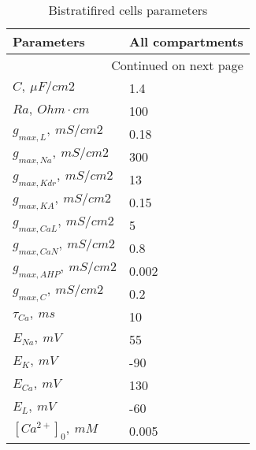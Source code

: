 \begin{longtable}{ll}
\caption{Bistratifired cells parameters}
\label{tabel:ca1_bis_cell_parameters}\\
\toprule
                                        Parameters & All compartments \\
\midrule
\endhead
\midrule
\multicolumn{2}{r}{{Continued on next page}} \\
\midrule
\endfoot

\bottomrule
\endlastfoot
$C,\ \mu F/cm2$ &    1.4 \\
$Ra,\ Ohm \cdot cm$ & 100 \\
$g_{max, L},\ mS/cm2 $ & 0.18 \\
$g_{max, Na}, \ mS/cm2$ &              300 \\
$g_{max, Kdr},\ mS/cm2$ &               13 \\
$g_{max, KA},\ mS/cm2$ &             0.15 \\
$g_{max, CaL},\ mS/cm2$   &                5 \\
$g_{max, CaN},\ mS/cm2$   &              0.8 \\
$g_{max, AHP},\ mS/cm2$   &            0.002 \\
$g_{max, C},\ mS/cm2$  &              0.2 \\
$\tau_{Ca},\ ms$  &               10 \\
$E_{Na}, \ mV $&               55 \\
$E_K, \ mV$ &              -90 \\
$E_{Ca}, \ mV$ &              130 \\
$E_L, \ mV$ &              -60 \\
$[Ca^{2+}]_0, \ mM$ &                0.005 \\
\end{longtable}

